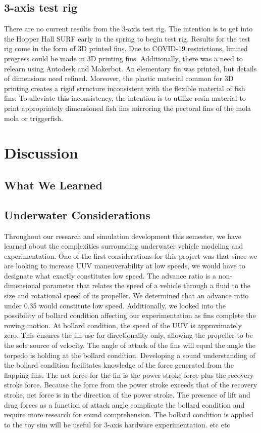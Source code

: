\documentclass[10pt]{article}
\begin{document}
\subsection{3-axis test rig}
There are no current results from the 3-axis test rig.  The intention is to get into the Hopper Hall SURF early in the spring to begin test rig.  Results for the test rig come in the form of 3D printed fins.  Due to COVID-19 restrictions, limited progress could be made in 3D printing fins.  Additionally, there was a need to relearn using Autodesk and Makerbot.  An elementary fin was printed, but details of dimensions need refined.  Moreover, the plastic material common for 3D printing creates a rigid structure inconsistent with the flexible material of fish fins.  To alleviate this inconsistency, the intention is to utilize resin material to print appropriately dimensioned fish fins mirroring the pectoral fins of the mola mola or triggerfish.

\section{Discussion}
\subsection{What We Learned}
\subsection{Underwater Considerations}
Throughout our research and simulation development this semester, we have learned about the complexities surrounding underwater vehicle modeling and experimentation. One of the first considerations for this project was that since we are looking to increase UUV maneuverability at low speeds, we would have to designate what exactly constitutes low speed. The advance ratio is a non-dimensional parameter that relates the speed of a vehicle through a fluid to the size and rotational speed of its propeller. We determined that an advance ratio under 0.35 would constitute low speed. Additionally, we looked into the possibility of bollard condition affecting our experimentation as fins complete the rowing motion.  At bollard condition, the speed of the UUV is approximately zero.  This ensures the fin use for directionality only, allowing the propeller to be the sole source of velocity.  The angle of attack of the fins will equal the angle the torpedo is holding at the bollard condition.  Developing a sound understanding of the bollard condition facilitates knowledge of the force generated from the flapping fins.  The net force for the fin is the power stroke force plus the recovery stroke force.  Because the force from the power stroke exceeds that of the recovery stroke, net force is in the direction of the power stroke.  The presence of lift and drag forces as a function of attack angle complicate the bollard condition and require more research for sound comprehension.  The bollard condition is applied to the toy sim will be useful for 3-axis hardware experimentation.  etc etc
\end{document}

